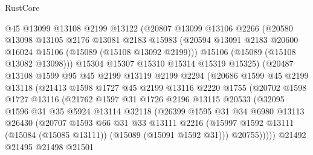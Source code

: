 \begin{lexlean}{RustCore}
\begin{coremodule}
              @45
              @13099
              @13108
              @2199
              @13122
              (@20807
                @13099
                @13106
                @2266
                (@20580
                  @13098
                  @13105
                  @2176
                  @13081
                  @2183
                  @15983
                  (@20594 @13091 @2183 @20600 @16024 @15106 (@15089 (@15108 @13092 @2199)))
                  @15106
                  (@15089 (@15108 @13082 @13098)))
                @15304
                @15307
                @15310
                @15314
                @15319
                @15325)
              (@20487
                @13108
                @1599
                @95
                @45
                @2199
                @13119
                @2199
                @2294
                (@20686
                  @1599
                  @45
                  @2199
                  @13118
                  (@21413
                    @1598
                    @1727
                    @45
                    @2199
                    @13116
                    @2220
                    @1755
                    (@20702
                      @1598
                      @1727
                      @13116
                      (@21762
                        @1597
                        @31
                        @1726
                        @2196
                        @13115
                        @20533
                        (@32095
                          @1596
                          @31
                          @35
                          @5924
                          @13114
                          @32118
                          (@26399
                            @1595
                            @31
                            @34
                            @6980
                            @13113
                            @26430
                            (@20707
                              @1593
                              @66
                              @31
                              @33
                              @13111
                              @2216
                              (@15997
                                @1592
                                @13111
                                (@15084 (@15085 @13111))
                                (@15089 (@15091 @1592 @31)))
                              @20755)))))
                    @21492
                    @21495
                    @21498
                    @21501

\end{coremodule}
\end{lexlean}
